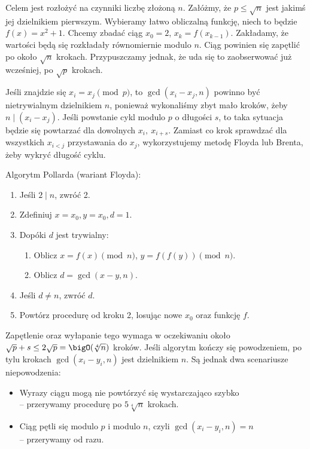 Celem jest rozłożyć na czynniki liczbę złożoną \( n \). Załóżmy, że \( p \leq \sqrt{n} \) jest jakimś jej dzielnikiem pierwszym.
Wybieramy łatwo obliczalną funkcję, niech to będzie \( f(x) = x^2 + 1 \). Chcemy zbadać ciąg \( x_0 = 2 \), \( x_k = f(x_{k-1}) \).
Zakładamy, że wartości będą się rozkładały równomiernie modulo \( n \). Ciąg powinien się zapętlić po około \( \sqrt{n} \) krokach. Przypuszczamy jednak, że uda się to zaobserwować już wcześniej, po \( \sqrt{p} \) krokach.

Jeśli znajdzie się \( x_i = x_j \pmod{p} \), to \( \gcd(x_i - x_j, n) \) powinno być nietrywialnym dzielnikiem \( n \), ponieważ wykonaliśmy zbyt mało kroków, żeby \( n \mid (x_i - x_j) \).
Jeśli powstanie cykl modulo \( p \) o długości \( s \), to taka sytuacja będzie się powtarzać dla dowolnych \( x_i, \ x_{i+s} \). Zamiast co krok sprawdzać dla wszystkich \( x_{i<j} \) przystawania do \( x_j \),
wykorzystujemy metodę Floyda lub Brenta, żeby wykryć długość cyklu.
\begin{greyframe}
	Algorytm Pollarda (wariant Floyda):
	\begin{enumerate}
		\item Jeśli \( 2 \mid n \), zwróć 2.
		\item Zdefiniuj \( x = x_0, y = x_0, d = 1 \).
		\item Dopóki \( d \) jest trywialny:
		      \begin{enumerate}
			      \item Oblicz \( x = f(x) \pmod{n} \), \( y = f(f(y)) \pmod{n} \).
			      \item Oblicz \( d = \gcd(x-y, n) \).
		      \end{enumerate}
		\item Jeśli \( d \neq n \), zwróć \( d \).
		\item Powtórz procedurę od kroku 2, losując nowe \( x_0 \) oraz funkcję \( f \).
	\end{enumerate}
\end{greyframe}
Zapętlenie oraz wyłapanie tego wymaga w oczekiwaniu około \( \sqrt{p} + s \leq 2\sqrt{p} = \bigO(\sqrt[4]{n}) \) kroków. Jeśli algorytm kończy się powodzeniem, po tylu krokach \( \gcd(x_i - y_i, n )\) jest dzielnikiem \( n \).
Są jednak dwa scenariusze niepowodzenia:
\begin{itemize}
	\item Wyrazy ciągu mogą nie powtórzyć się wystarczająco szybko \\
	      -- przerywamy procedurę po \( 5\sqrt[4]{n} \) krokach.
	\item Ciąg pętli się modulo \( p \) i modulo \( n \), czyli \( \gcd(x_i - y_i, n) = n \) \\
	      -- przerywamy od razu.
\end{itemize}

